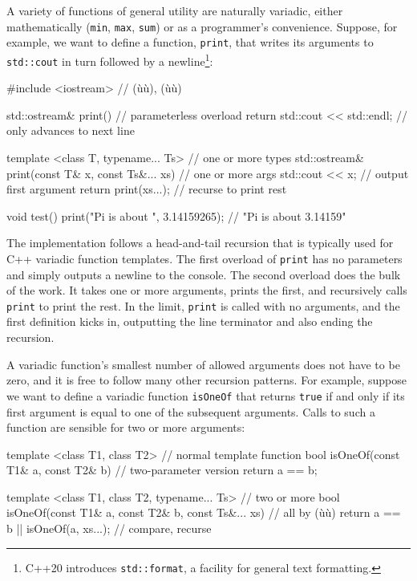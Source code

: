 A variety of functions of general utility are naturally variadic, either
mathematically (\lstinline!min!, \lstinline!max!, \lstinline!sum!) or as a
programmer's convenience. Suppose, for example, we want to define a
function, \lstinline!print!, that writes its arguments to
\lstinline!std::cout! in turn followed by a newline{\cprotect\footnote{C++20
introduces \lstinline!std::format!, a facility for general text
  formatting.}}:

\begin{emcppslisting}
#include <iostream>                  // (ù{}ù), (ù{}ù)

std::ostream& print()                // parameterless overload
{
    return std::cout << std::endl;   // only advances to next line
}

template <class T, typename... Ts>                // one or more types
std::ostream& print(const T& x, const Ts&... xs)  // one or more args
{
    std::cout << x;                               // output first argument
    return print(xs...);                          // recurse to print rest
}

void test()
{
    print("Pi is about ", 3.14159265);            // "Pi is about 3.14159"
}
\end{emcppslisting}
    

\noindent The implementation follows a head-and-tail recursion that is typically
used for C++ variadic function templates. The first overload of
\lstinline!print! has no parameters and simply outputs a newline to the
console. The second overload does the bulk of the work. It takes one or
more arguments, prints the first, and recursively calls \lstinline!print!
to print the rest. In the limit, \lstinline!print! is called with no
arguments, and the first definition kicks in, outputting the line
terminator and also ending the recursion.

A variadic function's smallest number of allowed arguments does not have
to be zero, and it is free to follow many other recursion patterns. For
example, suppose we want to define a variadic function \lstinline!isOneOf!
that returns \lstinline!true! if and only if its first argument is equal to
one of the subsequent arguments. Calls to such a function are sensible
for two or more arguments:

\begin{emcppslisting}
template <class T1, class T2>           // normal template function
bool isOneOf(const T1& a, const T2& b)  // two-parameter version
{
  return a == b;
}

template <class T1, class T2, typename... Ts>            // two or more
bool isOneOf(const T1& a, const T2& b, const Ts&... xs)  // all by (ù{}ù)
{
  return a == b || isOneOf(a, xs...);                    // compare, recurse
}
\end{emcppslisting}
    

